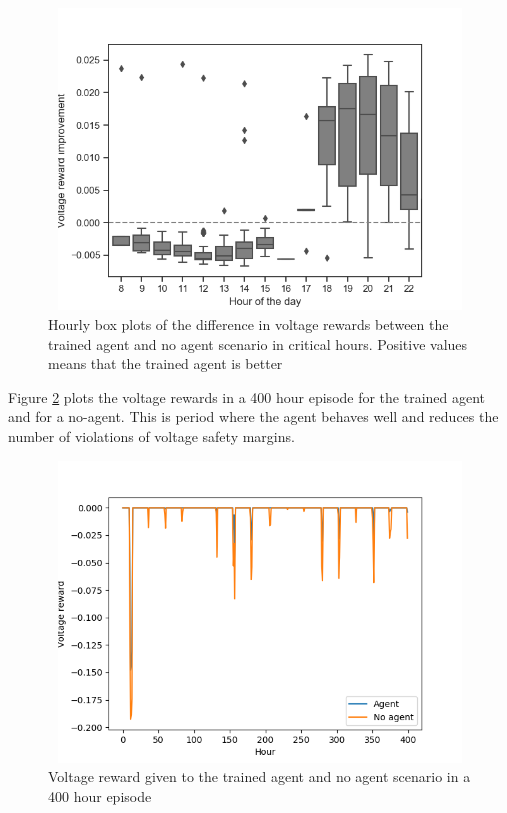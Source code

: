 \documentclass[class=book, crop=false]{standalone}
\begin{document}
\begin{figure}[h]
    \center
\includegraphics[height=8cm, width=12cm]{figures/config1_improvement_voltage.png}
    \caption[size = 9]{Hourly box plots of the difference in voltage rewards between the trained agent and no agent scenario in critical hours. Positive values means that the trained agent is better}
    \label{fig:results:config1_improvement_voltage}
\end{figure}


Figure \ref{fig:results:config1_400hour_good_voltage} plots the voltage rewards in a 400 hour episode for the trained agent and for a no-agent. This is period where the agent behaves well and reduces the number of violations of voltage safety margins. 

\begin{figure}[H]
    \center
\includegraphics[height=8cm, width=12cm]{figures/config1_400hour_good_voltage.png}
    \caption[size = 9]{Voltage reward given to the trained agent and no agent scenario in a 400 hour episode}
    \label{fig:results:config1_400hour_good_voltage}
\end{figure}
\end{document}
